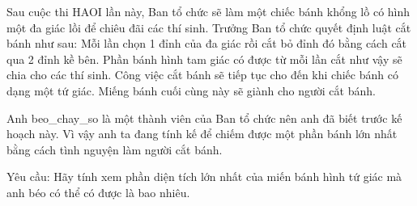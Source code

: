 Sau cuộc thi HAOI lần này, Ban tổ chức sẽ làm một chiếc bánh khổng lồ có hình một đa giác lồi để chiêu đãi các thí sinh. Trưởng Ban tổ chức quyết định luật cắt bánh như sau: Mỗi lần chọn 1 đỉnh của đa giác rồi cắt bỏ đỉnh đó bằng cách cắt qua 2 đỉnh kề bên. Phần bánh hình tam giác có được từ mỗi lần cắt như vậy sẽ chia cho các thí sinh. Công việc cắt bánh sẽ tiếp tục cho đến khi chiếc bánh có dạng một tứ giác. Miếng bánh cuối cùng này sẽ giành cho người cắt bánh.  

   Anh beo\_chay\_so là một thành viên của Ban tổ chức nên anh đã biết trước kế hoạch này. Vì vậy anh ta đang tính kế để chiếm được một phần bánh lớn nhất bằng cách tình nguyện làm người cắt bánh.  

   Yêu cầu: Hãy tính xem phần diện tích lớn nhất của miến bánh hình tứ giác mà anh béo có thể có được là bao nhiêu.  

\